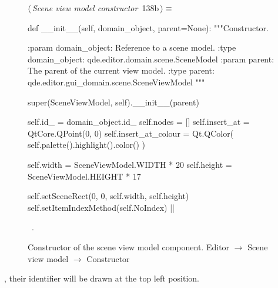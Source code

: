 \documentclass[%
    a4paper,    %
    justified,  %
    nobib,      %
    openany     %
]{tufte-book}
\makeatletter
\renewcommand{\label}[1]{\@tufte@label{##1}}%
\makeatother
\begin{document}
\begin{figure}[!htbp]
\begin{flushleft} \small
\begin{minipage}{\linewidth}\label{scrap89}\raggedright\small
{} $\langle\,${\itshape Scene view model constructor}\nobreak\ {\footnotesize {138b}}$\,\rangle\equiv$
\vspace{-1ex}
\begin{pythoncode}
def __init__(self, domain_object, parent=None):
   """Constructor.

   :param domain_object: Reference to a scene model.
   :type  domain_object: qde.editor.domain.scene.SceneModel
   :param parent:        The parent of the current view model.
   :type parent:         qde.editor.gui_domain.scene.SceneViewModel
   """

   super(SceneViewModel, self).__init__(parent)

   self.id_              = domain_object.id_
   self.nodes            = []
   self.insert_at        = QtCore.QPoint(0, 0)
   self.insert_at_colour = Qt.QColor(
      self.palette().highlight().color()
   )

   self.width            = SceneViewModel.WIDTH * 20
   self.height           = SceneViewModel.HEIGHT * 17

   self.setSceneRect(0, 0, self.width, self.height)
   self.setItemIndexMethod(self.NoIndex)
|\NWsep|
\end{pythoncode}
\vspace{1.5ex}
\footnotesize
\begin{list}{}{\setlength{\itemsep}{-\parsep}\setlength{\itemindent}{-\leftmargin}}
\item \NWtxtMacroRefIn\ .

\item{}
\end{list}
\end{minipage}\vspace{4ex}
\end{flushleft}
\caption{Constructor of the scene view model component.
  \newline{}\newline{}Editor $\rightarrow$ Scene view model $\rightarrow$
  Constructor}
\end{figure}

, their identifier
will be drawn at the top left position.
\end{document}
